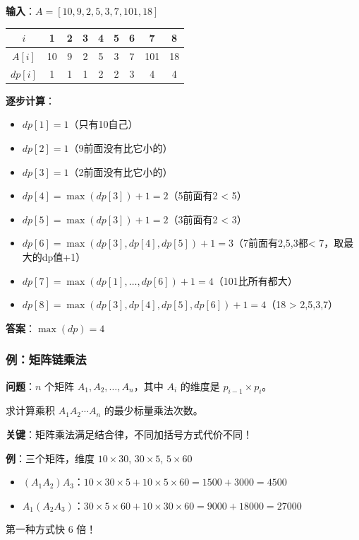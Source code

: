 \documentclass[12pt, a4paper]{ctexart}
\begin{document}
\begin{blackboard}

\textbf{输入}：$A = [10, 9, 2, 5, 3, 7, 101, 18]$

\begin{center}
\begin{tabular}{c|cccccccc}
$i$ & 1 & 2 & 3 & 4 & 5 & 6 & 7 & 8 \\
\hline
$A[i]$ & 10 & 9 & 2 & 5 & 3 & 7 & 101 & 18 \\
$dp[i]$ & 1 & 1 & 1 & 2 & 2 & 3 & 4 & 4 \\
\end{tabular}
\end{center}

\textbf{逐步计算}：

\begin{itemize}
    \item $dp[1] = 1$（只有10自己）
    \item $dp[2] = 1$（9前面没有比它小的）
    \item $dp[3] = 1$（2前面没有比它小的）
    \item $dp[4] = \max(dp[3]) + 1 = 2$（5前面有2 < 5）
    \item $dp[5] = \max(dp[3]) + 1 = 2$（3前面有2 < 3）
    \item $dp[6] = \max(dp[3], dp[4], dp[5]) + 1 = 3$（7前面有2,5,3都< 7，取最大的dp值+1）
    \item $dp[7] = \max(dp[1], \ldots, dp[6]) + 1 = 4$（101比所有都大）
    \item $dp[8] = \max(dp[3], dp[4], dp[5], dp[6]) + 1 = 4$（18 > 2,5,3,7）
\end{itemize}

\textbf{答案}：$\max(dp) = 4$

\end{blackboard}

\subsubsection{例：矩阵链乘法}

\begin{blackboard}[矩阵链乘法问题]

\textbf{问题}：$n$ 个矩阵 $A_1, A_2, \ldots, A_n$，其中 $A_i$ 的维度是 $p_{i-1} \times p_i$。

求计算乘积 $A_1 A_2 \cdots A_n$ 的最少标量乘法次数。

\textbf{关键}：矩阵乘法满足结合律，不同加括号方式代价不同！

\textbf{例}：三个矩阵，维度 $10 \times 30$, $30 \times 5$, $5 \times 60$

\begin{itemize}
    \item $(A_1 A_2) A_3$：$10 \times 30 \times 5 + 10 \times 5 \times 60 = 1500 + 3000 = 4500$
    \item $A_1 (A_2 A_3)$：$30 \times 5 \times 60 + 10 \times 30 \times 60 = 9000 + 18000 = 27000$
\end{itemize}

第一种方式快 6 倍！

\end{blackboard}
\end{document}

